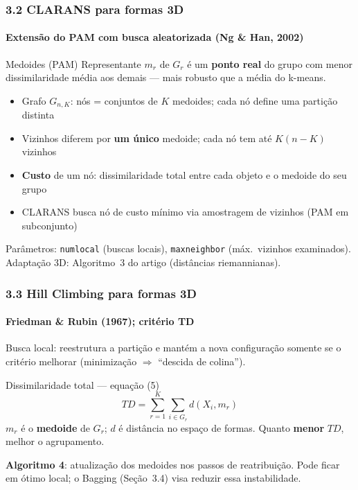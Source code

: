 \documentclass[brazilian,11pt]{beamer}
\begin{document}
\begin{frame}[shrink=5]
    \frametitle{3.2 CLARANS para formas 3D}
    \framesubtitle{Extensão do PAM com busca aleatorizada (Ng \& Han, 2002)}

    \begin{block}{Medoides (PAM)}
        Representante $m_r$ de $G_r$ é um \textbf{ponto real} do grupo com menor dissimilaridade média aos demais --- mais robusto que a média do k-means.
    \end{block}

    \begin{itemize}
        \item Grafo $G_{n,K}$: nós = conjuntos de $K$ medoides; cada nó define uma partição distinta
        \item Vizinhos diferem por \textbf{um único} medoide; cada nó tem até $K(n-K)$ vizinhos
        \item \textbf{Custo} de um nó: dissimilaridade total entre cada objeto e o medoide do seu grupo
        \item CLARANS busca nó de custo mínimo via amostragem de vizinhos (PAM em subconjunto)
    \end{itemize}

    Parâmetros: \texttt{numlocal} (buscas locais), \texttt{maxneighbor} (máx.\ vizinhos examinados). Adaptação 3D: Algoritmo~3 do artigo (distâncias riemannianas).
\end{frame}

\begin{frame}[shrink=8]
    \frametitle{3.3 Hill Climbing para formas 3D}
    \framesubtitle{Friedman \& Rubin (1967); critério TD}

    \small
    Busca local: reestrutura a partição e mantém a nova configuração somente se o critério melhorar (minimização $\Rightarrow$ ``descida de colina'').

    \begin{block}{Dissimilaridade total --- equação (5)}
        \begin{equation}
            TD = \sum_{r=1}^{K} \sum_{i \in G_r} d(X_i, m_r)
        \end{equation}
        $m_r$ é o \textbf{medoide} de $G_r$; $d$ é distância no espaço de formas. Quanto \textbf{menor} $TD$, melhor o agrupamento.
    \end{block}

    \textbf{Algoritmo 4}: atualização dos medoides nos passos de reatribuição. Pode ficar em ótimo local; o Bagging (Seção~3.4) visa reduzir essa instabilidade.
\end{frame}
\end{document}
